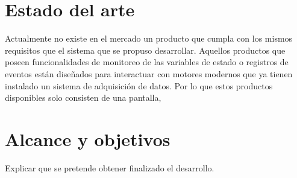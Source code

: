 \section{Estado del arte}

Actualmente no existe en el mercado un producto que cumpla con los mismos requisitos que el sistema que se propuso desarrollar. Aquellos productos que poseen funcionalidades de monitoreo de las variables de estado o registros de eventos están diseñados para interactuar con motores modernos  que ya tienen instalado un sistema de adquisición de datos. Por lo que estos productos disponibles solo consisten de una pantalla, 

\section{Alcance y objetivos}

Explicar que se pretende obtener finalizado el desarrollo.


